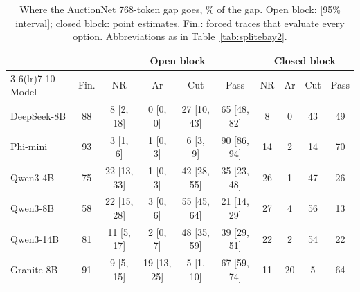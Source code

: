 \begin{table}[t]
\caption{Where the AuctionNet 768-token gap goes, \% of the gap. Open block: [95\% interval]; closed block: point estimates. Fin.: forced traces that evaluate every option. Abbreviations as in Table~\ref{tab:splitebay2}.}
\label{tab:ansplit}
\footnotesize
\centering

\begin{tabular}{lc cccc cccc}
\toprule
& & \multicolumn{4}{c}{Open block} & \multicolumn{4}{c}{Closed block} \\ \cmidrule(lr){3-6}\cmidrule(lr){7-10} Model & Fin. & NR & Ar & Cut & Pass & NR & Ar & Cut & Pass \\
\midrule
DeepSeek-8B & 88 & 8 [2, 18] & 0 [0, 0] & 27 [10, 43] & 65 [48, 82] & 8 & 0 & 43 & 49 \\
Phi-mini & 93 & 3 [1, 6] & 1 [0, 3] & 6 [3, 9] & 90 [86, 94] & 14 & 2 & 14 & 70 \\
Qwen3-4B & 75 & 22 [13, 33] & 1 [0, 3] & 42 [28, 55] & 35 [23, 48] & 26 & 1 & 47 & 26 \\
Qwen3-8B & 58 & 22 [15, 28] & 3 [0, 6] & 55 [45, 64] & 21 [14, 29] & 27 & 4 & 56 & 13 \\
Qwen3-14B & 81 & 11 [5, 17] & 2 [0, 7] & 48 [35, 59] & 39 [29, 51] & 22 & 2 & 54 & 22 \\
Granite-8B & 91 & 9 [5, 15] & 19 [13, 25] & 5 [1, 10] & 67 [59, 74] & 11 & 20 & 5 & 64 \\
\bottomrule
\end{tabular}
\end{table}
